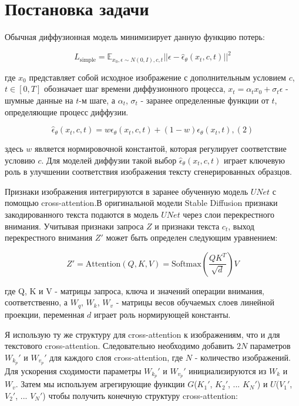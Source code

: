 \documentclass{article}
\begin{document}
\section{Постановка задачи}
Обычная диффузионная модель минимизирует данную функцию потерь:

\[
L_{\text{simple}} = \mathbb{E}_{x_0, \epsilon \sim N(0, I), c, t} ||\epsilon - \hat{\epsilon}_{\theta}(x_t, c, t) ||^2 
\]

где \(x_0\) представляет собой исходное изображение с дополнительным условием \(c\), \(t \in [0, T]\) обозначает шаг времени диффузионного процесса, \(x_t = \alpha_t x_0 + \sigma_t \epsilon\) - шумные данные на \(t\)-м шаге, а \(\alpha_t\), \(\sigma_t\) - заранее определенные функции от \(t\), определяющие процесс диффузии.

\[
\hat{\epsilon}_{\theta}(x_t, c, t) = w\epsilon_{\theta}(x_t, c, t) + (1 - w)\epsilon_{\theta}(x_t, t), (2)
\]

здесь \(w\) является нормировочной константой, которая регулирует соответствие условию \(c\). Для моделей диффузии такой выбор \(\hat{\epsilon}_{\theta}(x_t, c, t)\) играет ключевую роль в улучшении соответствия изображения тексту сгенерированных образцов.

Признаки изображения интегрируются в заранее обученную модель \(UNet\) с помощью cross-attention.В оригинальной модели Stable Diffusion признаки закодированного текста подаются в модель \(UNet\) через слои перекрестного внимания. Учитывая признаки запроса \(Z\) и признаки текста \(c_t\), выход перекрестного внимания \(Z'\) может быть определен следующим уравнением:

\[ Z' = \text{Attention}(Q, K, V) = \text{Softmax}\left(\frac{QK^T}{\sqrt{d}}\right)V\]

где Q, K и V - матрицы запроса, ключа и значений операции внимания, соответственно, а \(W_q\), \(W_k\), \(W_v\) - матрицы весов обучаемых слоев линейной проекции, переменная \(d\) играет роль нормирующей константы.

Я использую ту же структуру для cross-attention к изображениям, что и для текстового cross-attention. Следовательно необходимо добавить \(2N\) параметров \(W_k_p'\) и \(W_v_p'\) для каждого слоя cross-attention, где \(N\) - количество изображений. Для ускорения сходимости параметры \(W_k_p'\) и \(W_v_p'\) инициализируются из \(W_k\) и \(W_v\). Затем мы используем агрегирующие функции \(G\)(\(K_1'\), \(K_2'\), ... \(K_N'\)) 
и \(U\)(\(V_1'\), \(V_2'\), ... \(V_N'\)) чтобы получить конечную структуру cross-attention:
\end{document}
